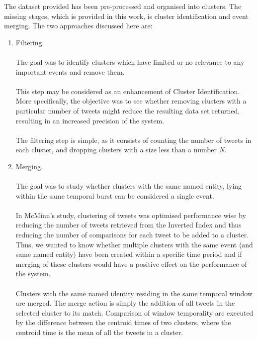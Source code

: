 \documentclass[a4paper,portrait,12pt]{article}
\begin{document}
The dataset provided has been pre-processed and organised into clusters.
The missing stages, which is provided in this work, is cluster identification and event merging.
The two approaches discussed here are:
\begin{enumerate}
	\item Filtering.\\
	      \\
	      The goal was to identify clusters which have limited or no relevance to any important events and remove them.\\
	      \\
	      This step may be considered as an enhancement of Cluster Identification.
	      More specifically, the objective was to see whether removing clusters with a particular number of tweets might reduce the resulting data set returned, resulting in an increased precision of the system. \\
	      \\
	      The filtering step is simple, as it consists of counting the number of tweets in each cluster, and dropping clusters with a size less than a number \textit{N}.

	\item Merging. \\
	      \\
	      The goal was to study whether clusters with the same named entity, lying within the same temporal burst can be considered a single event. \\
	      \\
	      In McMinn's study, clustering of tweets was optimised performance wise by reducing the number of tweets retrieved from the Inverted Index and thus reducing the number of comparisons for each tweet to be added to a cluster.
	      Thus, we wanted to know whether multiple clusters with the same event (and same named entity) have been created within a specific time period and if merging of these clusters would have a positive effect on the performance of the system. \\
	      \\
	      Clusters with the same named identity residing in the same temporal window are merged.
	      The merge action is simply the addition of all tweets in the selected cluster to its match.
	      Comparison of window temporality are executed by the difference between the centroid times of two clusters, where the centroid time is the mean of all the tweets in a cluster.\\


\end{enumerate}
\end{document}

